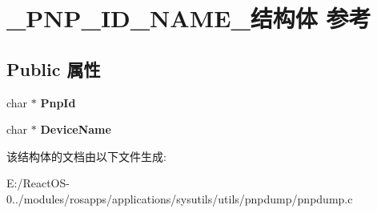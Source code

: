 \hypertarget{struct___p_n_p___i_d___n_a_m_e__}{}\section{\+\_\+\+P\+N\+P\+\_\+\+I\+D\+\_\+\+N\+A\+M\+E\+\_\+结构体 参考}
\label{struct___p_n_p___i_d___n_a_m_e__}
\subsection*{Public 属性}
\begin{DoxyCompactItemize}
\item 
\mbox{\label{struct___p_n_p___i_d___n_a_m_e___abcc9ac0619f47c22aa2f0f87d80a575d}} 
char $\ast$ {\bfseries Pnp\+Id}
\item 
\mbox{\label{struct___p_n_p___i_d___n_a_m_e___a7fc72c9e3453486df7e0ac5f7485626b}} 
char $\ast$ {\bfseries Device\+Name}
\end{DoxyCompactItemize}


该结构体的文档由以下文件生成\+:\begin{DoxyCompactItemize}
\item 
E\+:/\+React\+O\+S-\/0../modules/rosapps/applications/sysutils/utils/pnpdump/pnpdump.\+c\end{DoxyCompactItemize}
